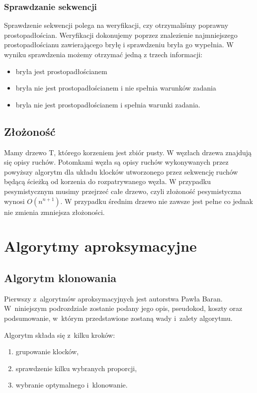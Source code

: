 \documentclass[12pt]{article}
\begin{document}
\subsubsection{Sprawdzanie sekwencji}
Sprawdzenie sekwencji polega na weryfikacji, czy otrzymaliśmy poprawny prostopadłościan. Weryfikacji dokonujemy
poprzez znalezienie najmniejszego prostopadłościanu zawierającego bryłę i sprawdzeniu bryła go wypełnia.
 W wyniku sprawdzenia możemy otrzymać jedną z trzech informacji:
\begin{itemize}
 \item bryła jest prostopadłościanem
 \item bryła nie jest prostopadłościanem i nie spełnia warunków zadania
 \item bryla nie jest prostopadłościanem i spełnia warunki zadania.
\end{itemize}

\subsection{Złożoność}
Mamy drzewo T, którego korzeniem jest zbiór pusty. W węzłach drzewa znajdują się opisy ruchów.
Potomkami węzła są opisy ruchów wykonywanych przez powyższy algorytm dla układu klocków utworzonego 
przez sekwencję ruchów będącą ścieżką od korzenia do rozpatrywanego węzła. 
W przypadku pesymistycznym musimy przejrzeć całe drzewo, czyli złożoność pesymistyczna wynosi $O(n^{n+1})$.
W przypadku średnim drzewo nie zawsze jest pełne co jednak nie zmienia zmniejsza złożoności. 


\section{Algorytmy aproksymacyjne}

\subsection{Algorytm klonowania}
Pierwszy z~algorytmów aproksymacyjnych jest autorstwa Pawła Baran.
W~niniejszym podrozdziale zostanie podany jego opis, pseudokod, koszty oraz
podsumowanie, w~którym przedstawione zostaną wady i~zalety algorytmu.

Algorytm składa się z~kilku kroków:
\begin{enumerate}
	\item grupowanie klocków,
	\item sprawdzenie kilku wybranych proporcji,
	\item wybranie optymalnego i~klonowanie.
\end{enumerate}
\end{document}
